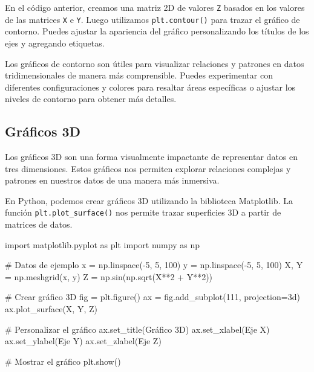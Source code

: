 \documentclass[
  a4paper,
]{article}
\newenvironment{Shaded}{}{}
\newcommand{\CommentTok}[1]{\textcolor[rgb]{0.42,0.45,0.49}{#1}}
\newcommand{\DecValTok}[1]{\textcolor[rgb]{0.00,0.36,0.77}{#1}}
\newcommand{\ImportTok}[1]{\textcolor[rgb]{0.01,0.18,0.38}{#1}}
\newcommand{\NormalTok}[1]{\textcolor[rgb]{0.14,0.16,0.18}{#1}}
\newcommand{\OperatorTok}[1]{\textcolor[rgb]{0.14,0.16,0.18}{#1}}
\newcommand{\StringTok}[1]{\textcolor[rgb]{0.01,0.18,0.38}{#1}}
\begin{document}
En el código anterior, creamos una matriz 2D de valores \texttt{Z}
basados en los valores de las matrices \texttt{X} e \texttt{Y}. Luego
utilizamos \texttt{plt.contour()} para trazar el gráfico de contorno.
Puedes ajustar la apariencia del gráfico personalizando los títulos de
los ejes y agregando etiquetas.

Los gráficos de contorno son útiles para visualizar relaciones y
patrones en datos tridimensionales de manera más comprensible. Puedes
experimentar con diferentes configuraciones y colores para resaltar
áreas específicas o ajustar los niveles de contorno para obtener más
detalles.

\hypertarget{gruxe1ficos-3d}{%
\subsection{Gráficos 3D}\label{gruxe1ficos-3d}}

Los gráficos 3D son una forma visualmente impactante de representar
datos en tres dimensiones. Estos gráficos nos permiten explorar
relaciones complejas y patrones en nuestros datos de una manera más
inmersiva.

En Python, podemos crear gráficos 3D utilizando la biblioteca
Matplotlib. La función \texttt{plt.plot\_surface()} nos permite trazar
superficies 3D a partir de matrices de datos.

\begin{Shaded}
\begin{Highlighting}[]
\ImportTok{import}\NormalTok{ matplotlib.pyplot }\ImportTok{as}\NormalTok{ plt}
\ImportTok{import}\NormalTok{ numpy }\ImportTok{as}\NormalTok{ np}

\CommentTok{\# Datos de ejemplo}
\NormalTok{x }\OperatorTok{=}\NormalTok{ np.linspace(}\OperatorTok{{-}}\DecValTok{5}\NormalTok{, }\DecValTok{5}\NormalTok{, }\DecValTok{100}\NormalTok{)}
\NormalTok{y }\OperatorTok{=}\NormalTok{ np.linspace(}\OperatorTok{{-}}\DecValTok{5}\NormalTok{, }\DecValTok{5}\NormalTok{, }\DecValTok{100}\NormalTok{)}
\NormalTok{X, Y }\OperatorTok{=}\NormalTok{ np.meshgrid(x, y)}
\NormalTok{Z }\OperatorTok{=}\NormalTok{ np.sin(np.sqrt(X}\OperatorTok{**}\DecValTok{2} \OperatorTok{+}\NormalTok{ Y}\OperatorTok{**}\DecValTok{2}\NormalTok{))}

\CommentTok{\# Crear gráfico 3D}
\NormalTok{fig }\OperatorTok{=}\NormalTok{ plt.figure()}
\NormalTok{ax }\OperatorTok{=}\NormalTok{ fig.add\_subplot(}\DecValTok{111}\NormalTok{, projection}\OperatorTok{=}\StringTok{\textquotesingle{}3d\textquotesingle{}}\NormalTok{)}
\NormalTok{ax.plot\_surface(X, Y, Z)}

\CommentTok{\# Personalizar el gráfico}
\NormalTok{ax.set\_title(}\StringTok{\textquotesingle{}Gráfico 3D\textquotesingle{}}\NormalTok{)}
\NormalTok{ax.set\_xlabel(}\StringTok{\textquotesingle{}Eje X\textquotesingle{}}\NormalTok{)}
\NormalTok{ax.set\_ylabel(}\StringTok{\textquotesingle{}Eje Y\textquotesingle{}}\NormalTok{)}
\NormalTok{ax.set\_zlabel(}\StringTok{\textquotesingle{}Eje Z\textquotesingle{}}\NormalTok{)}

\CommentTok{\# Mostrar el gráfico}
\NormalTok{plt.show()}
\end{Highlighting}
\end{Shaded}
\end{document}
